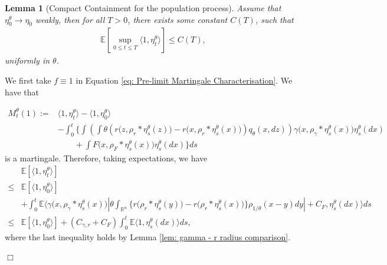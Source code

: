 \documentclass[12pt]{article}
\newenvironment {proof}{{\noindent\bf Proof }}{\hfill $\Box$ \medskip}
\newtheorem{lemma}[theorem]{Lemma}
\newcommand{\IE}{\mathbb E}
\begin{document}
\begin{lemma}[Compact Containment for the population process]
Assume that $\eta^{\theta}_0 \to \eta_0$ weakly,
then for all $T>0$, there exists some constant $C(T)$,
such that
    \begin{align}
        \IE\left[
            \sup_{0 \le t \le T}
            \langle 1, \eta^\theta_t \rangle
        \right]
        \le C(T) ,
    \end{align}
    uniformly in $\theta$.
\end{lemma}
\begin{proof}
We first take $f \equiv 1$ in Equation \eqref{eq: Pre-limit Martingale Characterisation}. We have that 

\begin{equation}
    \label{eq: Total Mass Martingale Characterisation}
\begin{aligned}
     M^{\theta}_t(1):=&  \langle 1,\eta^{\theta}_t \rangle
        -\langle 1,\eta^{\theta}_0 \rangle\\
 &-  \int_{0}^{t}\bigg\{   \int\left(   \int \theta
 \left(
        r\big(z,\rho_{r}*\eta^{\theta}_{s}(z)\big)
            -r\big(x,\rho_{r}*\eta^{\theta}_{s}(x)\big)
            \right)
                    q_\theta(x,dz)\right)
                            \gamma\big(x,\rho_{\gamma}*\eta^{\theta}_{s}(x)\big)
                            \eta^{\theta}_{s}(dx)\\
& \qquad +\int F\big(x,\rho_{F}*\eta^{\theta}_{s}(x)\big)
\eta^{\theta}_{s}(dx)\bigg\} ds
\end{aligned}    
\end{equation}
is a martingale.
Therefore, taking expectations, we have
\begin{equation}\label{eq: Total mass control generalised}
\begin{aligned}
&\mathbb{E}[\langle 1 ,\eta^{\theta}_{t}\rangle] \\
\leq &  \mathbb{E}[\langle 1 ,\eta^{\theta}_{0}\rangle] \\
&+ \int_{0}^{t}\mathbb{E}\bigg\langle
        \gamma\big(x,\rho_{\gamma}*\eta^{\theta}_{s}(x)\big)
            \left| \theta \int_{\mathbb{R}^n}
                    \big\{r\big(\rho_{r}*\eta^{\theta}_s(y)\big)-r\big(\rho_{r}*\eta^{\theta}_s(x)\big)\big\}
                    \rho_{1/\theta}(x-y)dy\right| + C_F 
                            ,\eta^{\theta}_s(dx)  \bigg\rangle ds\\
\leq &  \mathbb{E}[\langle 1 ,\eta^{\theta}_{0}\rangle] + (C_{\gamma,r} + C_F)\int_{0}^{t}\mathbb{E} \langle 1  ,\eta^{\theta}_s(dx) \rangle ds,
\end{aligned}
\end{equation}
where the last inequality holds by Lemma \ref{lem: gamma - r radius comparison}.


\end{proof}
\end{document}
